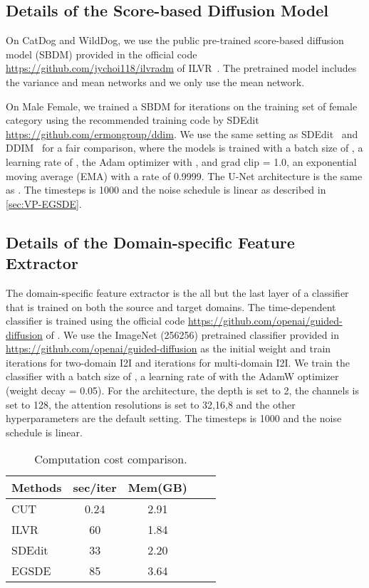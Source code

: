 \documentclass{article}
\begin{document}
\subsection{Details of the Score-based Diffusion Model}
On CatDog and WildDog, we use the public pre-trained score-based diffusion model (SBDM) provided in the official code
\href{https://github.com/jychoi118/ilvr_adm}{https://github.com/jychoi118/ilvradm} of ILVR~\cite{choi2021ilvr}. The pretrained model includes the variance and mean networks and we only use the mean network. 

On Male  Female, we trained a SBDM for  iterations on the training set of female category using the recommended training code by SDEdit \href{https://github.com/ermongroup/ddim}{https://github.com/ermongroup/ddim}. We use the same setting as SDEdit~\cite{meng2021sdedit} and DDIM~\cite{song2020denoising} for a fair comparison, where the models is trained with a batch size of , a learning rate
of , the Adam optimizer with ,  and grad clip = 1.0, an exponential moving average (EMA) with a rate of 0.9999. The U-Net architecture is the same as \cite{ho2020denoising}. The timesteps  is 1000
 and the noise schedule is linear as described in \ref{sec:VP-EGSDE}. 
 \subsection{Details of the Domain-specific Feature Extractor}
 The domain-specific feature extractor  is the all but the last layer of a classifier that is trained on both the source and target domains. The time-dependent classifier is trained using the official code \href{https://github.com/openai/guided-diffusion}{https://github.com/openai/guided-diffusion} of \cite{dhariwal2021diffusion}. We use the ImageNet (256256) pretrained classifier provided in \href{https://github.com/openai/guided-diffusion}{https://github.com/openai/guided-diffusion} as the initial weight and train  iterations for two-domain I2I and  iterations for multi-domain I2I. We train the classifier with a batch size of , a learning rate of  with the AdamW optimizer (weight decay = 0.05). For the architecture, the depth is set to 2, the channels is set to 128, the attention resolutions is set to 32,16,8 and the other hyperparameters are the default setting. The timesteps  is 1000 and the noise schedule is linear.
 

\begin{table}[]
\caption{Computation cost comparison.}
\label{tb : computation cost}
\centering
\vspace{.2cm}
\renewcommand\arraystretch{1.2}
\begin{tabular}{lcccc}
\toprule
 Methods      & sec/iter     & Mem(GB)    \\
\midrule
CUT & 0.24 & 2.91  \\
ILVR  & 60 & 1.84  \\ 
SDEdit & 33 & 2.20  \\ 
EGSDE & 85 & 3.64  \\ 
\bottomrule
\end{tabular}
\end{table}
\end{document}
